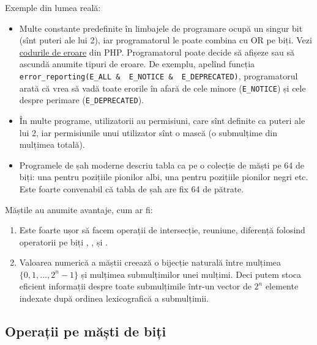 \documentclass[../main.tex]{subfiles}
\begin{document}
Exemple din lumea reală:

\begin{itemize}
  \item Multe constante predefinite în limbajele de programare ocupă un singur bit (sînt puteri ale lui 2), iar programatorul le poate combina cu OR pe biți. Vezi \href{https://www.php.net/manual/en/errorfunc.constants.php}{codurile de eroare} din PHP. Programatorul poate decide să afișeze sau să ascundă anumite tipuri de eroare. De exemplu, apelînd funcția \texttt{error_reporting(E_ALL & ~E_NOTICE & ~E_DEPRECATED)}, programatorul arată că vrea să vadă toate erorile în afară de cele minore (\texttt{E_NOTICE}) și cele despre perimare (\texttt{E_DEPRECATED}).

  \item În multe programe, utilizatorii au permisiuni, care sînt definite ca puteri ale lui 2, iar permisiunile unui utilizator sînt o mască (o submulțime din mulțimea totală).

  \item Programele de șah moderne descriu tabla ca pe o colecție de măști pe 64 de biți: una pentru pozițiile pionilor albi, una pentru pozițiile pionilor negri etc. Este foarte convenabil că tabla de șah are fix 64 de pătrate.
\end{itemize}

Măștile au anumite avantaje, cum ar fi:

\begin{enumerate}
  \item Este foarte ușor să facem operații de intersecție, reuniune, diferență folosind operatorii pe biți \ccode{&}, \ccode{|}, \ccode{^} și \ccode{~}.

  \item Valoarea numerică a măștii creează o bijecție naturală între mulțimea $\{0, 1, \dots, 2^n - 1\}$ și mulțimea submulțimilor unei mulțimi. Deci putem stoca eficient informații despre toate submulțimile într-un vector de $2^n$ elemente indexate după ordinea lexicografică a submulțimii.
\end{enumerate}

\subsection{Operații pe măști de biți}
\end{document}
